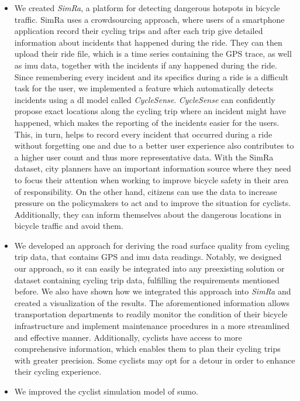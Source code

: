 \begin{itemize}
\item We created \textit{SimRa}, a platform for detecting dangerous hotspots in bicycle traffic.
SimRa uses a crowdsourcing approach, where users of a smartphone application record their cycling trips and after each trip give detailed information about incidents that happened during the ride.
They can then upload their ride file, which is a time series containing the GPS trace, as well as \ac{imu} data, together with the incidents if any happened during the ride.
Since remembering every incident and its specifics during a ride is a difficult task for the user, we implemented a feature which automatically detects incidents using a \ac{dl} model called \textit{CycleSense}.
\textit{CycleSense} can confidently propose exact locations along the cycling trip where an incident might have happened, which makes the reporting of the incidents easier for the users.
This, in turn, helps to record every incident that occurred during a ride without forgetting one and due to a better user experience also contributes to a higher user count and thus more representative data. 
With the SimRa dataset, city planners have an important information source where they need to focus their attention when working to improve bicycle safety in their area of responsibility.
On the other hand, citizens can use the data to increase pressure on the policymakers to act and to improve the situation for cyclists.
Additionally, they can inform themselves about the dangerous locations in bicycle traffic and avoid them.
\item We developed an approach for deriving the road surface quality from cycling trip data, that contains GPS and \ac{imu} data readings.
Notably, we designed our approach, so it can easily be integrated into any preexisting solution or dataset containing cycling trip data, fulfilling the requirements mentioned before.
We also have shown how we integrated this approach into \textit{SimRa} and created a visualization of the results.
The aforementioned information allows transportation departments to readily monitor the condition of their bicycle infrastructure and implement maintenance procedures in a more streamlined and effective manner.
Additionally, cyclists have access to more comprehensive information, which enables them to plan their cycling trips with greater precision.
Some cyclists may opt for a detour in order to enhance their cycling experience.
\item We improved the cyclist simulation model of \ac{sumo}.

\end{itemize}
